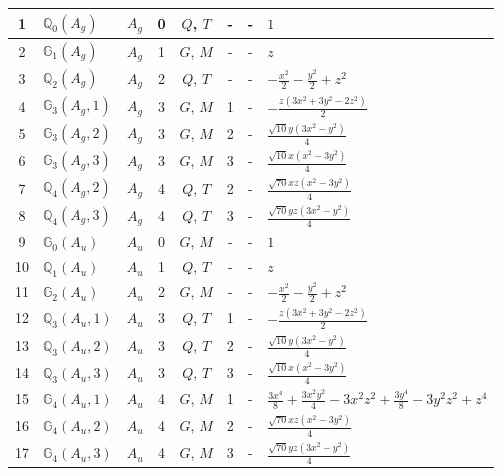 \documentclass[fleqn,10pt,landscape]{jsarticle}
\begin{document}
\begin{longtable}[l]{clcccccl}
1 & $\mathbb{Q}_{0}(A_{g})$ & $A_{g}$ & 0 & $Q$, $T$ & - & - & $1$ \\ \hline
2 & $\mathbb{G}_{1}(A_{g})$ & $A_{g}$ & 1 & $G$, $M$ & - & - & $z$ \\ \hline
3 & $\mathbb{Q}_{2}(A_{g})$ & $A_{g}$ & 2 & $Q$, $T$ & - & - & $- \frac{x^{2}}{2} - \frac{y^{2}}{2} + z^{2}$ \\ \hline
4 & $\mathbb{G}_{3}(A_{g},1)$ & $A_{g}$ & 3 & $G$, $M$ & 1 & - & $- \frac{z \left(3 x^{2} + 3 y^{2} - 2 z^{2}\right)}{2}$ \\ \hline
5 & $\mathbb{G}_{3}(A_{g},2)$ & $A_{g}$ & 3 & $G$, $M$ & 2 & - & $\frac{\sqrt{10} y \left(3 x^{2} - y^{2}\right)}{4}$ \\ \hline
6 & $\mathbb{G}_{3}(A_{g},3)$ & $A_{g}$ & 3 & $G$, $M$ & 3 & - & $\frac{\sqrt{10} x \left(x^{2} - 3 y^{2}\right)}{4}$ \\ \hline
7 & $\mathbb{Q}_{4}(A_{g},2)$ & $A_{g}$ & 4 & $Q$, $T$ & 2 & - & $\frac{\sqrt{70} x z \left(x^{2} - 3 y^{2}\right)}{4}$ \\ \hline
8 & $\mathbb{Q}_{4}(A_{g},3)$ & $A_{g}$ & 4 & $Q$, $T$ & 3 & - & $\frac{\sqrt{70} y z \left(3 x^{2} - y^{2}\right)}{4}$ \\ \hline
9 & $\mathbb{G}_{0}(A_{u})$ & $A_{u}$ & 0 & $G$, $M$ & - & - & $1$ \\ \hline
10 & $\mathbb{Q}_{1}(A_{u})$ & $A_{u}$ & 1 & $Q$, $T$ & - & - & $z$ \\ \hline
11 & $\mathbb{G}_{2}(A_{u})$ & $A_{u}$ & 2 & $G$, $M$ & - & - & $- \frac{x^{2}}{2} - \frac{y^{2}}{2} + z^{2}$ \\ \hline
12 & $\mathbb{Q}_{3}(A_{u},1)$ & $A_{u}$ & 3 & $Q$, $T$ & 1 & - & $- \frac{z \left(3 x^{2} + 3 y^{2} - 2 z^{2}\right)}{2}$ \\ \hline
13 & $\mathbb{Q}_{3}(A_{u},2)$ & $A_{u}$ & 3 & $Q$, $T$ & 2 & - & $\frac{\sqrt{10} y \left(3 x^{2} - y^{2}\right)}{4}$ \\ \hline
14 & $\mathbb{Q}_{3}(A_{u},3)$ & $A_{u}$ & 3 & $Q$, $T$ & 3 & - & $\frac{\sqrt{10} x \left(x^{2} - 3 y^{2}\right)}{4}$ \\ \hline
15 & $\mathbb{G}_{4}(A_{u},1)$ & $A_{u}$ & 4 & $G$, $M$ & 1 & - & $\frac{3 x^{4}}{8} + \frac{3 x^{2} y^{2}}{4} - 3 x^{2} z^{2} + \frac{3 y^{4}}{8} - 3 y^{2} z^{2} + z^{4}$ \\ \hline
16 & $\mathbb{G}_{4}(A_{u},2)$ & $A_{u}$ & 4 & $G$, $M$ & 2 & - & $\frac{\sqrt{70} x z \left(x^{2} - 3 y^{2}\right)}{4}$ \\ \hline
17 & $\mathbb{G}_{4}(A_{u},3)$ & $A_{u}$ & 4 & $G$, $M$ & 3 & - & $\frac{\sqrt{70} y z \left(3 x^{2} - y^{2}\right)}{4}$ \\ \hline

\end{longtable}
\end{document}

